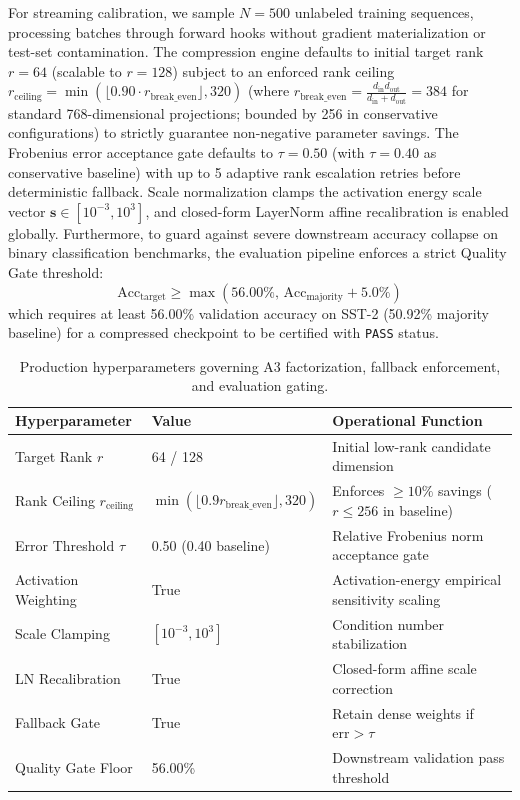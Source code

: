 For streaming calibration, we sample $N = 500$ unlabeled training sequences, processing batches through forward hooks without gradient materialization or test-set contamination. The compression engine defaults to initial target rank $r = 64$ (scalable to $r=128$) subject to an enforced rank ceiling $r_{\mathrm{ceiling}} = \min(\lfloor 0.90 \cdot r_{\mathrm{break\_even}}\rfloor, 320)$ (where $r_{\mathrm{break\_even}} = \frac{d_{\mathrm{in}} d_{\mathrm{out}}}{d_{\mathrm{in}} + d_{\mathrm{out}}} = 384$ for standard 768-dimensional projections; bounded by 256 in conservative configurations) to strictly guarantee non-negative parameter savings. The Frobenius error acceptance gate defaults to $\tau = 0.50$ (with $\tau = 0.40$ as conservative baseline) with up to 5 adaptive rank escalation retries before deterministic fallback. Scale normalization clamps the activation energy scale vector $\mathbf{s} \in [10^{-3}, 10^{3}]$, and closed-form LayerNorm affine recalibration is enabled globally. Furthermore, to guard against severe downstream accuracy collapse on binary classification benchmarks, the evaluation pipeline enforces a strict Quality Gate threshold:
\[
\mathrm{Acc}_{\mathrm{target}} \ge \max(56.00\%,\, \mathrm{Acc}_{\mathrm{majority}} + 5.0\%)
\tag{6.1}
\]
which requires at least 56.00\% validation accuracy on SST-2 (50.92\% majority baseline) for a compressed checkpoint to be certified with \texttt{PASS} status.

\begin{table}[H]
\centering
\small
\begin{tabular}{lll}
\toprule
\textbf{Hyperparameter} & \textbf{Value} & \textbf{Operational Function} \\
\midrule
Target Rank $r$ & 64 / 128 & Initial low-rank candidate dimension \\
Rank Ceiling $r_{\mathrm{ceiling}}$ & $\min(\lfloor 0.9 r_{\mathrm{break\_even}}\rfloor, 320)$ & Enforces $\ge 10\%$ savings ($r \le 256$ in baseline) \\
Error Threshold $\tau$ & 0.50 (0.40 baseline) & Relative Frobenius norm acceptance gate \\
Activation Weighting & True & Activation-energy empirical sensitivity scaling \\
Scale Clamping & $[10^{-3}, 10^{3}]$ & Condition number stabilization \\
LN Recalibration & True & Closed-form affine scale correction \\
Fallback Gate & True & Retain dense weights if $\mathrm{err} > \tau$ \\
Quality Gate Floor & 56.00\% & Downstream validation pass threshold \\
\bottomrule
\end{tabular}
\caption{Production hyperparameters governing A3 factorization, fallback enforcement, and evaluation gating.}
\label{tab:a3_hyperparameters}
\end{table}

